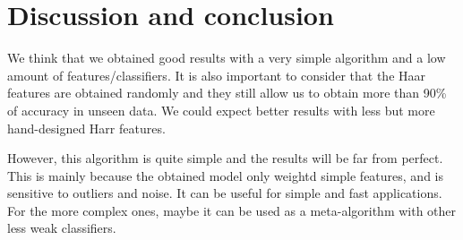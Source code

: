 \documentclass{article}
\begin{document}
\section{Discussion and conclusion}

We think that we obtained good results with a very simple algorithm and a low amount of features/classifiers. It is also important to consider that the Haar features are obtained randomly and they still allow us to obtain more than 90\% of accuracy in unseen data. We could expect better results with less but more hand-designed Harr features. 

However, this algorithm is quite simple and the results will be far from perfect. This is mainly because the obtained model only weightd simple features, and is sensitive to outliers and noise. It can be useful for simple and fast applications. For the more complex ones, maybe it can be used as a meta-algorithm with other less weak classifiers.
\end{document}
